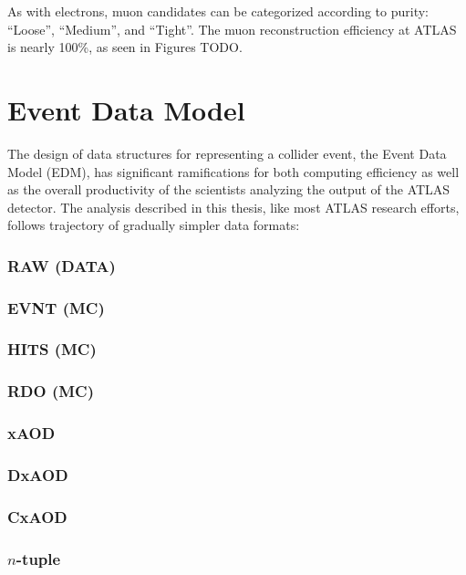 As with electrons, muon candidates can be categorized according to purity: ``Loose'', ``Medium'', and ``Tight''.
The muon reconstruction efficiency at ATLAS is nearly 100\%, as seen in Figures TODO.


\section{Event Data Model}
The design of data structures for representing a collider event, the Event Data Model (EDM), has significant ramifications for both computing efficiency as well as the overall productivity of the scientists analyzing the output of the ATLAS detector.
The analysis described in this thesis, like most ATLAS research efforts, follows trajectory of gradually simpler data formats: 

\subsubsection{RAW (DATA)}
\subsubsection{EVNT (MC)}
\subsubsection{HITS (MC)}
\subsubsection{RDO (MC)}
\subsubsection{xAOD}
\subsubsection{DxAOD}
\subsubsection{CxAOD}
\subsubsection{$n$-tuple}

